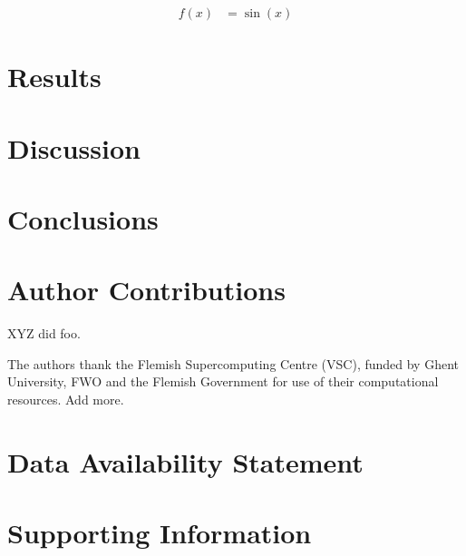 \documentclass[aip,preprint]{revtex4-1}
\begin{document}
    \begin{align}
        f(x) &= \sin(x)
    \end{align}

    \section{Results}
    \label{sec:results}

    \section{Discussion}
    \label{sec:discussion}

    \section{Conclusions}
    \label{sec:conclusions}

    \section*{Author Contributions}
    \label{sec:author-contributions}

    XYZ did foo.

    \begin{acknowledgments}
    The authors thank the Flemish Supercomputing Centre (VSC),
    funded by Ghent University,
    FWO and the Flemish Government for use of their computational resources.
    Add more.
    \end{acknowledgments}

    \section*{Data Availability Statement}
    \label{sec:datastatement}

    \section*{Supporting Information}
    \label{sec:suppinfo}

    
\end{document}
